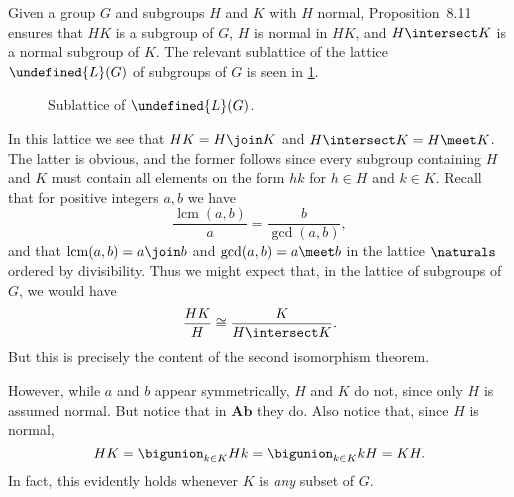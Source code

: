 \documentclass[article, a4paper, 11pt, oneside]{memoir}
\let\mathfrak\undefined
\numberwithin{equation}{chapter}
\newcommand{\frakL}{\mathfrak{L}}
\newcommand{\ncat}[1]{\mathbf{#1}} %
\newcommand{\catAb}{\ncat{Ab}} %
\theoremstyle{nonumberplain}
\DeclareMathOperator{\lcm}{lcm}
\begin{document}
\begin{remarkbreak}
    Given a group $G$ and subgroups $H$ and $K$ with $H$ normal, Proposition~8.11 ensures that $HK$ is a subgroup of $G$, $H$ is normal in $HK$, and $H \intersect K$ is a normal subgroup of $K$. The relevant sublattice of the lattice $\frakL(G)$ of subgroups of $G$ is seen in \cref{fig:lattice-of-subgroups}.
    
    \begin{figure}[!h]
        \centering
        \caption{Sublattice of $\frakL(G)$.}
        \label{fig:lattice-of-subgroups}
    \end{figure}

    In this lattice we see that $HK = H \join K$ and $H \intersect K = H \meet K$. The latter is obvious, and the former follows since every subgroup containing $H$ and $K$ must contain all elements on the form $hk$ for $h \in H$ and $k \in K$. Recall that for positive integers $a,b$ we have
    \begin{equation*}
        \frac{ \lcm(a,b) }{a}
            = \frac{b}{ \gcd(a,b) },
    \end{equation*}
    and that $\lcm(a,b) = a \join b$ and $\gcd(a,b) = a \meet b$ in the lattice $\naturals$ ordered by divisibility. Thus we might expect that, in the lattice of subgroups of $G$, we would have
    \begin{equation*}
        \frac{HK}{H}
            \cong \frac{K}{H \intersect K}.
    \end{equation*}
    But this is precisely the content of the second isomorphism theorem.

    However, while $a$ and $b$ appear symmetrically, $H$ and $K$ do not, since only $H$ is assumed normal. But notice that in $\catAb$ they do. Also notice that, since $H$ is normal,
    \begin{equation*}
        HK
            = \bigunion_{k \in K} Hk
            = \bigunion_{k \in K} kH
            = KH.
    \end{equation*}
    In fact, this evidently holds whenever $K$ is \emph{any} subset of $G$.
\end{remarkbreak}
\end{document}
